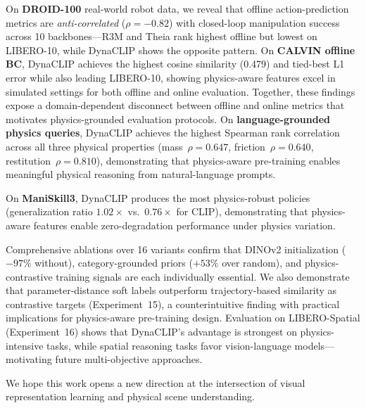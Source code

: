 \documentclass{article}
\newcommand{\methodname}{DynaCLIP}
\begin{document}
On \textbf{DROID-100} real-world robot data, we reveal that offline action-prediction metrics are \emph{anti-correlated} ($\rho{=}-0.82$) with closed-loop manipulation success across 10 backbones---R3M and Theia rank highest offline but lowest on LIBERO-10, while \methodname{} shows the opposite pattern. On \textbf{CALVIN offline BC}, \methodname{} achieves the highest cosine similarity (0.479) and tied-best L1 error while also leading LIBERO-10, showing physics-aware features excel in simulated settings for both offline and online evaluation. Together, these findings expose a domain-dependent disconnect between offline and online metrics that motivates physics-grounded evaluation protocols.
On \textbf{language-grounded physics queries}, \methodname{} achieves the highest Spearman rank correlation across all three physical properties (mass~$\rho{=}0.647$, friction~$\rho{=}0.640$, restitution~$\rho{=}0.810$), demonstrating that physics-aware pre-training enables meaningful physical reasoning from natural-language prompts.

On \textbf{ManiSkill3}, \methodname{} produces the most physics-robust policies (generalization ratio $1.02\times$ vs.\ $0.76\times$ for CLIP), demonstrating that physics-aware features enable zero-degradation performance under physics variation.

Comprehensive ablations over 16 variants confirm that DINOv2 initialization ($-97\%$ without), category-grounded priors ($+53\%$ over random), and physics-contrastive training signals are each individually essential. We also demonstrate that parameter-distance soft labels outperform trajectory-based similarity as contrastive targets (Experiment~15), a counterintuitive finding with practical implications for physics-aware pre-training design. Evaluation on LIBERO-Spatial (Experiment~16) shows that \methodname{}'s advantage is strongest on physics-intensive tasks, while spatial reasoning tasks favor vision-language models---motivating future multi-objective approaches.

We hope this work opens a new direction at the intersection of visual representation learning and physical scene understanding.
\end{document}
